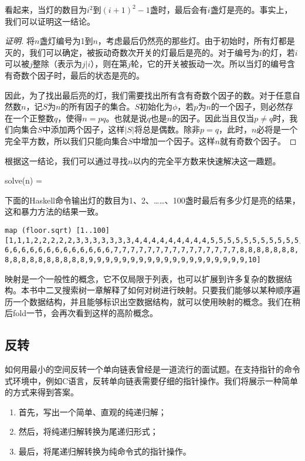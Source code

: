 \documentclass[UTF8]{article}
\begin{document}
看起来，当灯的数目为$i^2$到$(i+1)^2-1$盏时，最后会有$i$盏灯是亮的。事实上，我们可以证明这一结论。

\begin{proof}[证明]
将$n$盏灯编号为1到$n$，考虑最后仍然亮的那些灯。由于初始时，所有灯都是灭的，我们可以确定，被扳动奇数次开关的灯最后是亮的。对于编号为$i$的灯，若$i$可以被$j$整除（表示为$j | i$），则在第$j$轮，它的开关被扳动一次。所以当灯的编号含有奇数个因子时，最后的状态是亮的。

因此，为了找出最后亮的灯，我们需要找出所有含有奇数个因子的数。对于任意自然数$n$，记$S$为$n$的所有因子的集合。$S$初始化为$\phi$，若$p$为$n$的一个因子，则必然存在一个正整数$q$，使得$n = p q$。也就是说$q$也是$n$的因子。因此当且仅当$p \neq q$时，我们向集合$S$中添加两个因子，这样$|S|$将总是偶数。除非$p = q$，此时，$n$必将是一个完全平方数，所以我们只能向集合$S$中增加一个因子。这样$n$就有奇数个因子。
\end{proof}

根据这一结论，我们可以通过寻找$n$以内的完全平方数来快速解决这一趣题。

\be
solve(n) = \lfloor {} \rfloor
\ee

下面的Haskell命令输出灯的数目为1、2、……、100盏时最后有多少灯是亮的结果，这和暴力方法的结果一致。

\begin{lstlisting}[style=Haskell]
map (floor.sqrt) [1..100]
[1,1,1,2,2,2,2,2,3,3,3,3,3,3,3,4,4,4,4,4,4,4,4,4,5,5,5,5,5,5,5,5,5,5,5,
6,6,6,6,6,6,6,6,6,6,6,6,6,7,7,7,7,7,7,7,7,7,7,7,7,7,7,7,8,8,8,8,8,8,8,
8,8,8,8,8,8,8,8,8,8,9,9,9,9,9,9,9,9,9,9,9,9,9,9,9,9,9,9,9,10]
\end{lstlisting}

映射是一个一般性的概念，它不仅局限于列表，也可以扩展到许多复杂的数据结构。本书中二叉搜索树一章解释了如何对树进行映射。只要我们能够以某种顺序遍历一个数据结构，并且能够标识出空数据结构，就可以使用映射的概念。我们在稍后fold一节，会再次看到这样的高阶概念。

\subsection{反转}

如何用最小的空间反转一个单向链表曾经是一道流行的面试题。在支持指针的命令式环境中，例如C语言，反转单向链表需要仔细的指针操作。我们将展示一种简单的方式来得到答案。

\begin{enumerate}
\item 首先，写出一个简单、直观的纯递归解；
\item 然后，将纯递归解转换为尾递归形式；
\item 最后，将尾递归解转换为纯命令式的指针操作。
\end{enumerate}
\end{document}
